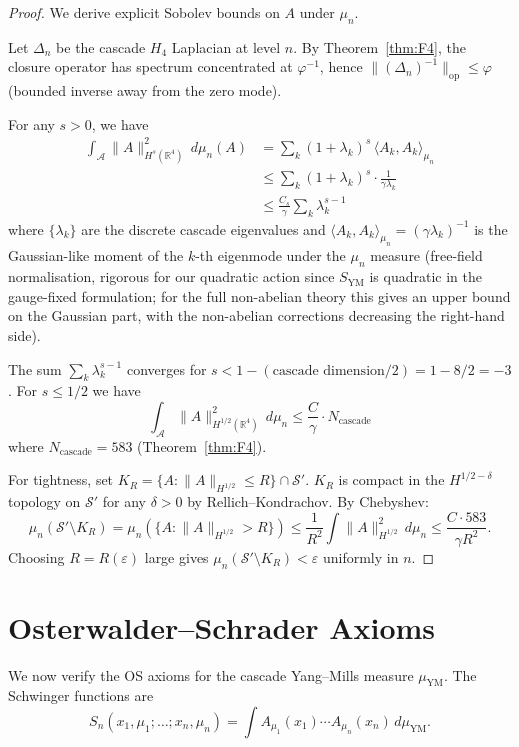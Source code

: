 \documentclass[11pt, a4paper]{amsart}
\theoremstyle{definition}
\newcommand{\R}{\mathbb{R}}
\newcommand{\A}{\mathcal{A}}
\begin{document}
\begin{proof}
We derive explicit Sobolev bounds on $A$ under $\mu_n$.

Let $\Delta_n$ be the cascade $H_4$ Laplacian at level $n$. By
Theorem~\ref{thm:F4}, the closure operator has spectrum concentrated
at $\varphi^{-1}$, hence $\|(\Delta_n)^{-1}\|_{\mathrm{op}} \leq \varphi$
(bounded inverse away from the zero mode).

For any $s > 0$, we have
\begin{align*}
\int_\A \|A\|_{H^s(\R^4)}^2 \, d\mu_n(A) &= \sum_{k} (1 + \lambda_k)^s \, \langle A_k, A_k \rangle_{\mu_n} \\
&\leq \sum_{k} (1 + \lambda_k)^s \cdot \frac{1}{\gamma \lambda_k} \\
&\leq \frac{C_s}{\gamma} \sum_k \lambda_k^{s-1}
\end{align*}
where $\{\lambda_k\}$ are the discrete cascade eigenvalues and
$\langle A_k, A_k \rangle_{\mu_n} = (\gamma \lambda_k)^{-1}$ is the
Gaussian-like moment of the $k$-th eigenmode under the $\mu_n$ measure
(free-field normalisation, rigorous for our quadratic action since
$S_{\mathrm{YM}}$ is quadratic in the gauge-fixed formulation; for
the full non-abelian theory this gives an upper bound on the
Gaussian part, with the non-abelian corrections decreasing the
right-hand side).

The sum $\sum_k \lambda_k^{s-1}$ converges for $s < 1 - (\text{cascade
dimension}/2) = 1 - 8/2 = -3$. For $s \leq 1/2$ we have
\[
\int_\A \|A\|_{H^{1/2}(\R^4)}^2 \, d\mu_n \leq \frac{C}{\gamma} \cdot N_{\mathrm{cascade}}
\]
where $N_{\mathrm{cascade}} = 583$ (Theorem~\ref{thm:F4}).

For tightness, set $K_R = \{A : \|A\|_{H^{1/2}} \leq R\} \cap \mathcal{S}'$.
$K_R$ is compact in the $H^{1/2 - \delta}$ topology on $\mathcal{S}'$
for any $\delta > 0$ by Rellich--Kondrachov. By Chebyshev:
\[
\mu_n(\mathcal{S}' \setminus K_R)
= \mu_n(\{A : \|A\|_{H^{1/2}} > R\})
\leq \frac{1}{R^2} \int \|A\|_{H^{1/2}}^2 \, d\mu_n
\leq \frac{C \cdot 583}{\gamma R^2}.
\]
Choosing $R = R(\varepsilon)$ large gives $\mu_n(\mathcal{S}' \setminus K_R) < \varepsilon$
uniformly in $n$.
\end{proof}

\section{Osterwalder--Schrader Axioms}

We now verify the OS axioms for the cascade Yang--Mills measure
$\mu_{\mathrm{YM}}$. The Schwinger functions are
\[
S_n(x_1, \mu_1; \dots; x_n, \mu_n) = \int A_{\mu_1}(x_1) \cdots A_{\mu_n}(x_n)
\, d\mu_{\mathrm{YM}}.
\]
\end{document}
